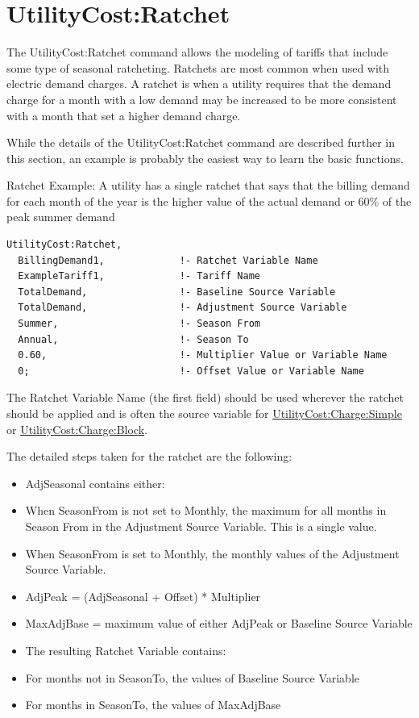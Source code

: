 \section{UtilityCost:Ratchet}\label{utilitycostratchet}

The UtilityCost:Ratchet command allows the modeling of tariffs that include some type of seasonal ratcheting. Ratchets are most common when used with electric demand charges. A ratchet is when a utility requires that the demand charge for a month with a low demand may be increased to be more consistent with a month that set a higher demand charge.

While the details of the UtilityCost:Ratchet command are described further in this section, an example is probably the easiest way to learn the basic functions.

Ratchet Example: A utility has a single ratchet that says that the billing demand for each month of the year is the higher value of the actual demand or 60\% of the peak summer demand

\begin{lstlisting}
UtilityCost:Ratchet,
  BillingDemand1,             !- Ratchet Variable Name
  ExampleTariff1,             !- Tariff Name
  TotalDemand,                !- Baseline Source Variable
  TotalDemand,                !- Adjustment Source Variable
  Summer,                     !- Season From
  Annual,                     !- Season To
  0.60,                       !- Multiplier Value or Variable Name
  0;                          !- Offset Value or Variable Name
\end{lstlisting}

The Ratchet Variable Name (the first field) should be used wherever the ratchet should be applied and is often the source variable for \hyperref[utilitycostchargesimple]{UtilityCost:Charge:Simple} or \hyperref[utilitycostchargeblock]{UtilityCost:Charge:Block}.

The detailed steps taken for the ratchet are the following:

\begin{itemize}
\item
  AdjSeasonal contains either:
\item
  When SeasonFrom is not set to Monthly, the maximum for all months in Season From in the Adjustment Source Variable. This is a single value.
\item
  When SeasonFrom is set to Monthly, the monthly values of the Adjustment Source Variable.
\item
  AdjPeak = (AdjSeasonal + Offset) * Multiplier
\item
  MaxAdjBase = maximum value of either AdjPeak or Baseline Source Variable
\item
  The resulting Ratchet Variable contains:
\item
  For months not in SeasonTo, the values of Baseline Source Variable
\item
  For months in SeasonTo, the values of MaxAdjBase
\end{itemize}

